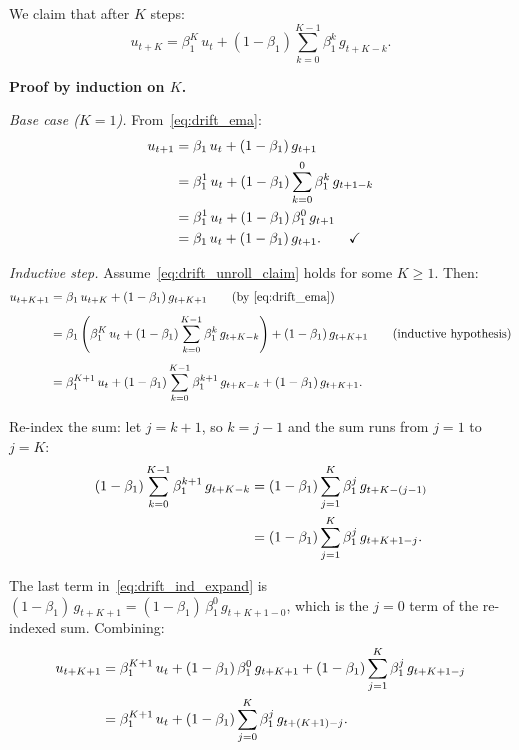 \documentclass{article}
\begin{document}
We claim that after $K$ steps:
\begin{equation}
u_{t+K} = \beta_1^K\,u_t + (1-\beta_1)\sum_{k=0}^{K-1}\beta_1^k\,g_{t+K-k}.
\label{eq:drift_unroll_claim}
\end{equation}

\noindent\textbf{Proof by induction on $K$.}

\emph{Base case ($K = 1$).}
From~\eqref{eq:drift_ema}:
\begin{align}
u_{t+1}
&= \beta_1\,u_t + (1-\beta_1)\,g_{t+1} \notag \\
&= \beta_1^1\,u_t + (1-\beta_1)\sum_{k=0}^{0}\beta_1^k\,g_{t+1-k} \notag \\
&= \beta_1^1\,u_t + (1-\beta_1)\,\beta_1^0\,g_{t+1} \notag \\
&= \beta_1\,u_t + (1-\beta_1)\,g_{t+1}. \qquad\checkmark
\label{eq:drift_base}
\end{align}

\emph{Inductive step.}
Assume~\eqref{eq:drift_unroll_claim} holds for some $K \geq 1$. Then:
\begin{align}
u_{t+K+1}
&= \beta_1\,u_{t+K} + (1-\beta_1)\,g_{t+K+1}
\qquad\text{(by~\eqref{eq:drift_ema})}
\notag \\[4pt]
&= \beta_1\left(\beta_1^K\,u_t
   + (1-\beta_1)\sum_{k=0}^{K-1}\beta_1^k\,g_{t+K-k}\right)
   + (1-\beta_1)\,g_{t+K+1}
\qquad\text{(inductive hypothesis)}
\notag \\[4pt]
&= \beta_1^{K+1}\,u_t
   + (1-\beta_1)\sum_{k=0}^{K-1}\beta_1^{k+1}\,g_{t+K-k}
   + (1-\beta_1)\,g_{t+K+1}.
\label{eq:drift_ind_expand}
\end{align}

Re-index the sum: let $j = k + 1$, so $k = j - 1$ and the sum runs
from $j = 1$ to $j = K$:
\begin{align}
(1-\beta_1)\sum_{k=0}^{K-1}\beta_1^{k+1}\,g_{t+K-k}
&= (1-\beta_1)\sum_{j=1}^{K}\beta_1^{j}\,g_{t+K-(j-1)} \notag \\
&= (1-\beta_1)\sum_{j=1}^{K}\beta_1^{j}\,g_{t+K+1-j}.
\label{eq:drift_reindex}
\end{align}

The last term in~\eqref{eq:drift_ind_expand} is
$(1-\beta_1)\,g_{t+K+1} = (1-\beta_1)\,\beta_1^0\,g_{t+K+1-0}$,
which is the $j = 0$ term of the re-indexed sum. Combining:
\begin{align}
u_{t+K+1}
&= \beta_1^{K+1}\,u_t
   + (1-\beta_1)\,\beta_1^0\,g_{t+K+1}
   + (1-\beta_1)\sum_{j=1}^{K}\beta_1^{j}\,g_{t+K+1-j} \notag \\
&= \beta_1^{K+1}\,u_t
   + (1-\beta_1)\sum_{j=0}^{K}\beta_1^{j}\,g_{t+(K+1)-j}.
\label{eq:drift_ind_done}
\end{align}
\end{document}
